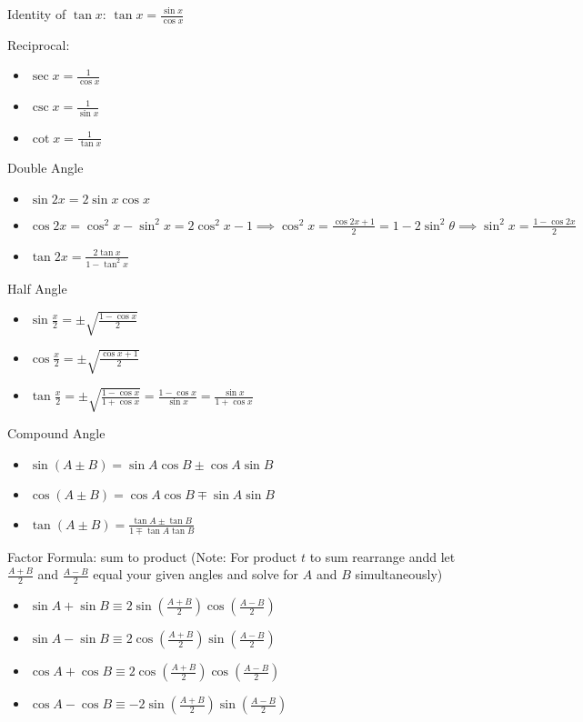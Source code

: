 \documentclass[10pt,a4paper,oneside]{book}
\begin{document}
Identity of $\tan x$: $\tan{x}=\frac{\sin x}{\cos x}$

Reciprocal:
\begin{itemize}
    \item $\sec{x}=\frac{1}{\cos x}$
    \item $\csc x = \frac{1}{\sin x}$
    \item $\cot x = \frac{1}{\tan x}$
\end{itemize}

Double Angle 
\begin{itemize}
    \item $\sin 2x = 2\sin x\cos x$
    \item $\cos 2x = \cos^2 x-\sin^2 x = 2\cos^2x -1 \implies \cos^2x = \frac{\cos 2x+1}{2} = 1-2\sin^2\theta \implies \sin^2 x = \frac{1-\cos 2x}{2}$
    \item $\tan 2x = \frac{2\tan x}{1-\tan^2 x}$
\end{itemize}

Half Angle 
\begin{itemize}
    \item $\sin \frac{x}{2}=\pm \sqrt{\frac{1-\cos x}{2}}$
    \item $\cos \frac{x}{2}=\pm \sqrt{\frac{\cos x+1}{2}}$
    \item $\tan \frac{x}{2}=\pm \sqrt{\frac{1-\cos x}{1+\cos x}}=\frac{1-\cos x}{\sin x}=\frac{\sin x}{1+\cos x}$
\end{itemize}

Compound Angle 
\begin{itemize}
    \item $\sin(A\pm B)=\sin A\cos B\pm \cos A\sin B$
    \item $\cos(A\pm B)=\cos A\cos B\mp \sin A\sin B$
    \item $\tan(A\pm B)=\frac{\tan A\pm \tan B}{1\mp \tan A\tan B}$
\end{itemize}

Factor Formula: sum to product (Note: For product $t$ to sum rearrange andd let $\frac{A+B}{2}$ and $\frac{A-B}{2}$ equal your given angles and solve for $A$ and $B$ simultaneously)
\begin{itemize}
    \item $\sin A+\sin B\equiv 2\sin\left(\frac{A+B}{2}\right)\cos\left(\frac{A-B}{2}\right)$
    \item $\sin A-\sin B\equiv 2\cos\left(\frac{A+B}{2}\right)\sin\left(\frac{A-B}{2}\right)$
    \item $\cos A+\cos B\equiv 2\cos\left(\frac{A+B}{2}\right)\cos\left(\frac{A-B}{2}\right)$
    \item $\cos A-\cos B \equiv -2\sin\left(\frac{A+B}{2}\right)\sin\left(\frac{A-B}{2}\right)$
\end{itemize}
\end{document}
